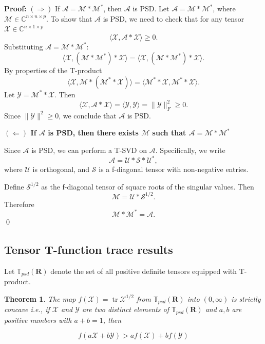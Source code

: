 \documentclass[oupthm]{CUP-JNL-BCM}%
\theoremstyle{oupplain}
\newtheorem{theorem}{Theorem}[section]
\theoremstyle{oupdefinition}
\theoremstyle{oupremark}
\theoremstyle{oupproof}
\numberwithin{equation}{section}
\begin{document}
\noindent\textbf{Proof:} \( (\Rightarrow) \) If \( \mathcal{A} = \mathcal{M} * \mathcal{M}^* \), then \( \mathcal{A} \) is PSD. Let \( \mathcal{A} = \mathcal{M} * \mathcal{M}^* \), where \( \mathcal{M} \in \mathbb{C}^{n \times n \times p} \). To show that \( \mathcal{A} \) is PSD, we need to check that for any tensor \( \mathcal{X} \in \mathbb{C}^{n \times 1 \times p} \)
    \[
    \langle \mathcal{X}, \mathcal{A} * \mathcal{X} \rangle \geq 0.
    \]
    Substituting \( \mathcal{A} = \mathcal{M} * \mathcal{M}^* \):
    \[
    \langle \mathcal{X},(\mathcal{M} * \mathcal{M}^*) * \mathcal{X} \rangle = \langle \mathcal{X}, (\mathcal{M} * \mathcal{M}^*) * \mathcal{X} \rangle.
    \]
    By properties of the T-product
    \[
    \langle \mathcal{X}, \mathcal{M} * (\mathcal{M}^* * \mathcal{X}) \rangle = \langle \mathcal{M}^* * \mathcal{X}, \mathcal{M}^* * \mathcal{X} \rangle.
    \]
    Let \( \mathcal{Y} = \mathcal{M}^* * \mathcal{X} \). Then
    \[
    \langle \mathcal{X}, \mathcal{A} * \mathcal{X} \rangle = \langle \mathcal{Y}, \mathcal{Y} \rangle = \| \mathcal{Y} \|_F^2 \geq 0.
    \]
    Since \( \| \mathcal{Y} \|^2 \geq 0 \), we conclude that \( \mathcal{A} \) is PSD.

    \noindent \textbf{\( (\Leftarrow) \) If \( \mathcal{A} \) is PSD, then there exists \( \mathcal{M} \) such that \( \mathcal{A} = \mathcal{M} * \mathcal{M}^* \)}

  \noindent  Since \( \mathcal{A} \) is PSD, we can perform a T-SVD on \( \mathcal{A} \). Specifically, we write
    \[
    \mathcal{A} = \mathcal{U} * \mathcal{S} * \mathcal{U}^*,
    \]
    where \( \mathcal{U} \) is orthogonal, and \( \mathcal{S} \) is a f-diagonal tensor with non-negative entries. 

   \noindent Define \( \mathcal{S}^{1/2} \) as the f-diagonal tensor of square roots of the singular values. Then
    \[
    \mathcal{M} = \mathcal{U} * \mathcal{S}^{1/2}.
    \]
    Therefore
    \[
    \mathcal{M} * \mathcal{M}^* = \mathcal{A}.
    \] \hfill \qed


    \subsection{Tensor T-function trace results}
Let $\mathbb{T}_{psd}(\mathbf{R})$ denote the set of all positive definite tensors equipped with T-product.


\begin{theorem}
    The map $f(\mathcal{X})=\operatorname{tr} \mathcal{X}^{1 / 2}$ from $\mathbb{T}_{psd}(\mathbf{R})$ into $(0, \infty)$ is strictly concave i.e., if $\mathcal{X}$ and $\mathcal{Y}$ are two distinct elements of $\mathbb{T}_{psd}(\mathbf{R})$ and $a, b$ are positive numbers with $a+b=1$, then

$$
f(a \mathcal{X}+b \mathcal{Y})>a f(\mathcal{X})+b f(\mathcal{Y})
$$
\end{theorem}
\end{document}

